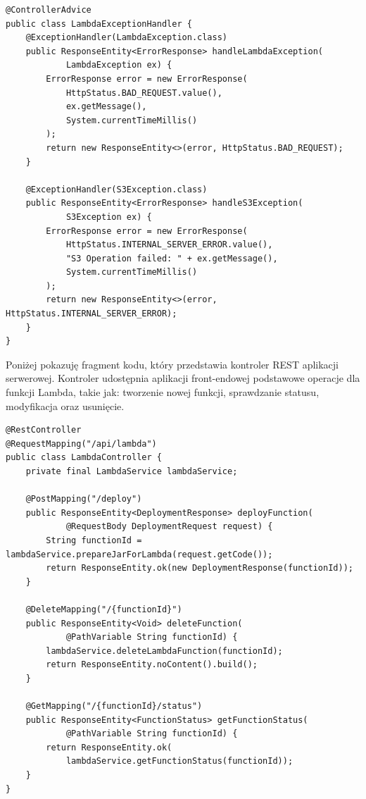 \documentclass[runningheads,12pt]{llncs}
\begin{document}
\begin{verbatim}
@ControllerAdvice
public class LambdaExceptionHandler {
    @ExceptionHandler(LambdaException.class)
    public ResponseEntity<ErrorResponse> handleLambdaException(
            LambdaException ex) {
        ErrorResponse error = new ErrorResponse(
            HttpStatus.BAD_REQUEST.value(),
            ex.getMessage(),
            System.currentTimeMillis()
        );
        return new ResponseEntity<>(error, HttpStatus.BAD_REQUEST);
    }

    @ExceptionHandler(S3Exception.class)
    public ResponseEntity<ErrorResponse> handleS3Exception(
            S3Exception ex) {
        ErrorResponse error = new ErrorResponse(
            HttpStatus.INTERNAL_SERVER_ERROR.value(),
            "S3 Operation failed: " + ex.getMessage(),
            System.currentTimeMillis()
        );
        return new ResponseEntity<>(error, HttpStatus.INTERNAL_SERVER_ERROR);
    }
}
\end{verbatim}

Poniżej pokazuję fragment kodu, który przedstawia kontroler REST aplikacji serwerowej. Kontroler udostępnia aplikacji front-endowej podstawowe operacje dla funkcji Lambda, takie jak: tworzenie nowej funkcji, sprawdzanie statusu, modyfikacja oraz usunięcie.

\begin{verbatim}
@RestController
@RequestMapping("/api/lambda")
public class LambdaController {
    private final LambdaService lambdaService;

    @PostMapping("/deploy")
    public ResponseEntity<DeploymentResponse> deployFunction(
            @RequestBody DeploymentRequest request) {
        String functionId = lambdaService.prepareJarForLambda(request.getCode());
        return ResponseEntity.ok(new DeploymentResponse(functionId));
    }

    @DeleteMapping("/{functionId}")
    public ResponseEntity<Void> deleteFunction(
            @PathVariable String functionId) {
        lambdaService.deleteLambdaFunction(functionId);
        return ResponseEntity.noContent().build();
    }

    @GetMapping("/{functionId}/status")
    public ResponseEntity<FunctionStatus> getFunctionStatus(
            @PathVariable String functionId) {
        return ResponseEntity.ok(
            lambdaService.getFunctionStatus(functionId));
    }
}
\end{verbatim}

\end{document}

